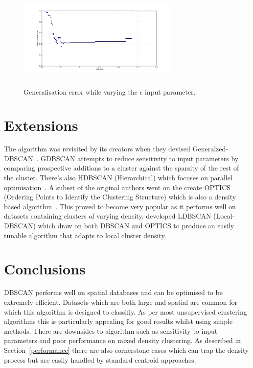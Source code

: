 \documentclass{ecsarticle}     %
\begin{document}
\begin{figure}[ht]
   \centering
    \includegraphics[height = 5cm,width = 8cm]{error.pdf}
   \caption{Generalisation error while varying the $\epsilon$ input parameter.}
   \label{fig:error}
\end{figure}




\section{Extensions}

The algorithm was revisited by its creators when they devised Generalzed-DBSCAN~\citep{ester98gdbscan}.
GDBSCAN attempts to reduce sensitivity to input parameters by comparing prospective additions to a cluster against the sparsity of the rest of the cluster. 
There's also HDBSCAN (Hierarchical) which focuses on parallel optimisation~\citep{li11}.
A subset of the original authors went on the create OPTICS (Ordering Points to Identify the Clustering Structure) which is also a density based algorithm~\citep{Ankerst99optics}.
This proved to become very popular as it performs well on datasets containing clusters of varying density.    
\cite{lian07ldbscan} developed LDBSCAN (Local-DBSCAN) which draw on both DBSCAN and OPTICS to produce an easily tunable algorithm that adapts to local cluster density.


\section{Conclusions}
DBSCAN performs well on spatial databases and can be optimised to be extremely efficient.
Datasets which are both large and spatial are common for which this algorithm is designed to classifiy.
As per most unsupervised clustering algorithms this is particularly appealing for good results whilst using simple methods. 
There are downsides to algorithm such as sensitivity to input parameters and poor performance on mixed density clustering.
As described in Section~\ref{performance} there are also cornerstone cases which can trap the density process but are easily handled by standard centroid approaches.
\end{document}
